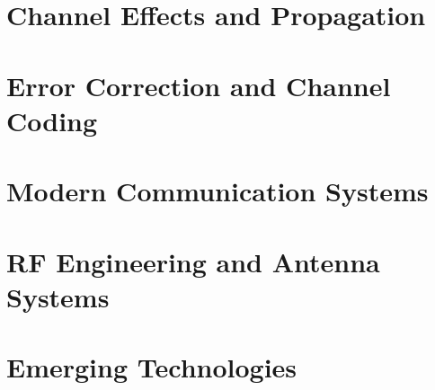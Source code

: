 \documentclass[11pt,twoside,openany]{book}
\begin{document}
\part{Channel Effects and Propagation}










\part{Error Correction and Channel Coding}








\part{Modern Communication Systems}









\part{RF Engineering and Antenna Systems}


\part{Emerging Technologies}


\end{document}
